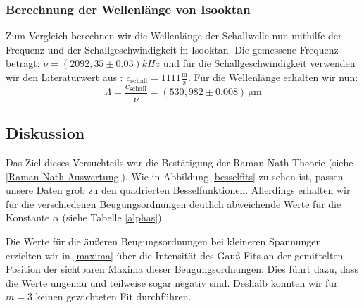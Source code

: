\documentclass[12pt]{article}
\begin{document}
\subsubsection{Berechnung der Wellenlänge von Isooktan}\label{isooktanlit}
Zum Vergleich berechnen wir die Wellenlänge der Schallwelle nun mithilfe der Frequenz und der Schallgeschwindigkeit in Isooktan. Die gemessene Frequenz beträgt: $\nu=(2092,35\pm0.03)kHz$ und für die Schallgeschwindigkeit verwenden wir den Literaturwert aus \cite{staat}: $c_{\mathrm{schall}}=1111\mathrm{\frac{m}{s}}$.
Für die Wellenlänge erhalten wir nun: $$\Lambda=\frac{c_{\mathrm{schall}}}{\nu}=(530,982\pm0.008) \,\mathrm{\mu m}$$
\newpage
\subsection{Diskussion}
Das Ziel dieses Versuchteils war die Bestätigung der Raman-Nath-Theorie (siehe \ref{Raman-Nath-Auswertung}). Wie in Abbildung \ref{besselfits} zu sehen ist, passen unsere Daten grob zu den quadrierten Besselfunktionen. Allerdings erhalten wir für die verschiedenen Beugungsordnungen deutlich abweichende Werte für die Konstante $\alpha$ (siehe Tabelle \ref{alphas}). 
\begin{table}[h!]
\end{table}

Die Werte für die äußeren Beugungsordnungen bei kleineren Spannungen erzielten wir in \ref{maxima} über die Intensität des Gauß-Fits an der gemittelten Position der sichtbaren Maxima dieser Beugungsordnungen. Dies führt dazu, dass die Werte ungenau und teilweise sogar negativ sind. Deshalb konnten wir für $m=3$ keinen gewichteten Fit durchführen.
\end{document}
